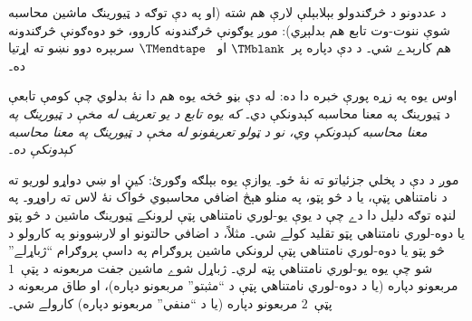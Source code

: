 \documentclass[../../../include/open-logic-section]{subfiles}
\begin{document}
د عددونو د څرګندولو بېلابېلې لارې هم شته (او په دې توګه د ټيورينګ
ماشين محاسبه شوې ننوت-وت تابع هم بدلېږي): موږ يوګونې څرګندونه کاروو،
خو دوه‌ګونې څرګندونه هم کارېدے شي۔ د دې دپاره پر~$\TMblank$ او
~$\TMendtape$ سربېره دوو نښو ته اړتيا ده۔

اوس يوه په زړه پورې خبره دا ده: له دې بڼو څخه يوه هم دا نۀ بدلوي چې
کومې تابعې د ټيورينګ په معنا محاسبه کېدونکې دي۔ \emph{که يوه تابع د
يو تعريف له مخې د ټيورينګ په معنا محاسبه کېدونکې وي، نو د ټولو
تعريفونو له مخې د ټيورينګ په معنا محاسبه کېدونکې ده۔}

موږ د دې د پخلي جزئياتو ته نۀ ځو۔ يوازې يوه بېلګه وګورئ: کيڼ او ښي
دواړو لوريو ته د نامتناهي پټې، يا د څو پټو، په منلو هېڅ اضافي
محاسبوي ځواک نۀ لاس ته راوړو۔ په لنډه توګه دليل دا دے چې د يوې
يو-لوري نامتناهي پټې لرونکے ټيورينګ ماشين د څو پټو يا دوه-لوري
نامتناهي پټو تقليد کولے شي۔ مثلاً، د اضافي حالتونو او لارښوونو په
کارولو د څو پټو يا دوه-لوري نامتناهي پټې لرونکي ماشين پروګرام په
داسې پروګرام ``ژباړلے'' شو چې يوه يو-لوري نامتناهي پټه لري۔ ژباړل
شوے ماشين جفت مربعونه د پټې~$1$ مربعونو دپاره (يا د دوه-لوري
نامتناهي پټې د ``مثبتو'' مربعونو دپاره)، او طاق مربعونه د پټې~$2$
مربعونو دپاره (يا د ``منفي'' مربعونو دپاره) کارولے شي۔
\end{document}

